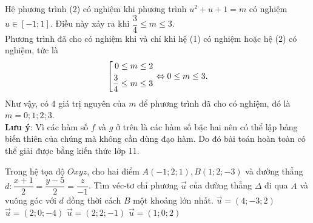 \begin{ex}
{\begin{center}
	 \end{center}
 Hệ phương trình (2) có nghiệm khi phương trình $u^2+u+1=m$ có nghiệm $u\in[-1;1]$. Điều này xảy ra khi $\dfrac{3}{4}\leq m\leq 3$.\\
 Phương trình đã cho có nghiệm khi và chỉ khi hệ (1) có nghiệm hoặc hệ (2) có nghiệm, tức là $$\left[\begin{aligned}0\leq m\leq 2\\\dfrac{3}{4}\leq m\leq 3\end{aligned}\right. \Leftrightarrow 0\leq m\leq 3.$$
 Như vậy, có $4$ giá trị nguyên của $m$ để phương trình đã cho có nghiệm, đó là $m=0;1;2;3$.\\
 \textbf{Lưu ý}: Vì các hàm số $f$ và $g$ ở trên là các hàm số bậc hai nên có thể lập bảng biến thiên của chúng mà không cần dùng đạo hàm. Do đó bài toán hoàn toàn có thể giải được bằng kiến thức lớp 11.
	}
\end{ex}

  \begin{ex}%
	Trong hệ tọa độ $Oxyz$, cho hai điểm $A(-1;2;1), B(1;2;-3)$ và đường thẳng $d \colon \dfrac{x+1}{2}=\dfrac{y-5}{2}=\dfrac{z}{-1}$. Tìm véc-tơ chỉ phương $\vec{u}$ của đường thẳng $\Delta$ đi qua $A$ và vuông góc với $d$ đồng thời cách $B$ một khoảng lớn nhất.
	\choice
	{\True $\vec{u}=(4;-3;2) $}
	{$\vec{u}=(2;0;-4) $}
	{$\vec{u}=(2;2;-1) $}
	{$\vec{u}=(1;0;2) $}
	
\end{ex}


